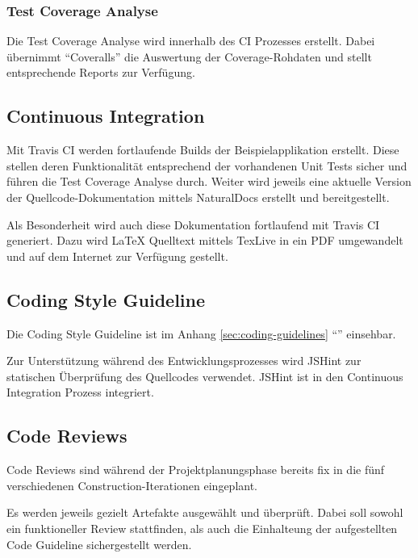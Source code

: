 \subsubsection*{Test Coverage Analyse}
Die Test Coverage Analyse wird innerhalb des CI Prozesses erstellt. Dabei übernimmt ``Coveralls'' \cite{Coveralls} die Auswertung der Coverage-Rohdaten und stellt entsprechende Reports zur Verfügung.

\subsection{Continuous Integration}
\label{sec:continuousintegration}

Mit Travis CI \cite{TravisCI} werden fortlaufende Builds der Beispielapplikation erstellt. Diese stellen deren Funktionalität entsprechend der vorhandenen Unit Tests sicher und führen die Test Coverage Analyse durch.
Weiter wird jeweils eine aktuelle Version der Quellcode-Dokumentation mittels NaturalDocs erstellt und bereitgestellt.

Als Besonderheit wird auch diese Dokumentation fortlaufend mit Travis CI generiert. Dazu wird LaTeX Quelltext mittels TexLive in ein PDF umgewandelt und auf dem Internet zur Verfügung gestellt.

\subsection{Coding Style Guideline}
Die Coding Style Guideline ist im Anhang \ref{sec:coding-guidelines} ``'' einsehbar.

Zur Unterstützung während des Entwicklungsprozesses wird JSHint \cite{JSHint} zur statischen Überprüfung des Quellcodes verwendet. JSHint ist in den Continuous Integration Prozess integriert.

\subsection{Code Reviews}
Code Reviews sind während der Projektplanungsphase bereits fix in die fünf verschiedenen Construction-Iterationen eingeplant.

Es werden jeweils gezielt Artefakte ausgewählt und überprüft. Dabei soll sowohl ein funktioneller Review stattfinden, als auch die Einhalteung der aufgestellten Code Guideline sichergestellt werden.